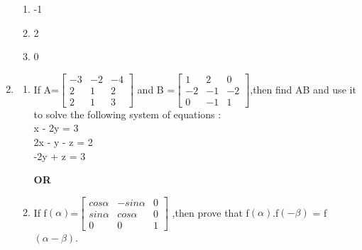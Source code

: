 \documentclass[12pt,-letter paper]{article}
\begin{document}
\begin{enumerate}
\begin{enumerate}[label=(\alph*)]
    \item -1
    \item 2
    \item 0
\end{enumerate}
\item
\begin{enumerate}[label=(\alph*)]
    \item 
If A=\begin{math}
\begin{bmatrix}
    -3 & -2 & -4\\
    2 & 1 & 2\\
    2 & 1 & 3
\end{bmatrix}
\end{math}
and B =\begin{math}
\begin{bmatrix}
    1 & 2 & 0\\
    -2 & -1 & -2\\
    0 & -1 & 1
\end{bmatrix}
\end{math},then find AB and use it to solve the following system of equations :
\\x - 2y = 3
\\2x - y - z = 2
\\-2y + z = 3
\begin{center}{\textbf{OR}}
\end{center}
\item If f\((\alpha)\)=\begin{math}
\begin{bmatrix}
    cos\alpha & -sin\alpha & 0\\
    sin\alpha & cos\alpha & 0\\
    0 & 0 & 1
\end{bmatrix}
\end{math} ,then prove that f\((\alpha)\).f\((-\beta)\) = f\((\alpha - \beta)\).
\end{enumerate}
 \end{enumerate}
\end{document}
